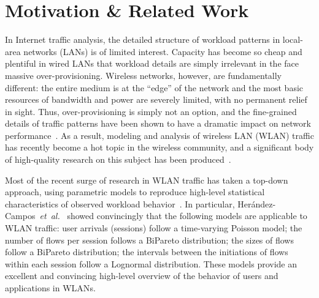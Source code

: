 \documentclass[conference]{IEEEtran}
\newcommand{\caps}[1]{{\small{#1}}}
\begin{document}


\section{Motivation \& Related Work}
\label{sec:motivation}
\label{sec:related-work}

In Internet traffic analysis, the detailed structure of workload patterns in local-area networks (\caps{LAN}s) is of limited interest. 
Capacity has become so cheap and plentiful in wired \caps{LAN}s that workload details are simply irrelevant in the face massive over-provisioning. Wireless networks, however, are fundamentally different: the entire medium is at the ``edge'' of the network and the most basic resources of bandwidth and power are severely limited, with no permanent relief in sight. Thus, over-provisioning is simply not an option, and the fine-grained details of traffic patterns have been shown to have a dramatic impact on network performance~\cite{Karpinski07:realism,Karpinski07:cbr-failure}.
As a result, modeling and analysis of wireless \caps{LAN} (\caps{WLAN}) traffic has recently become a hot topic in the wireless community, and a significant body of high-quality research on this subject has been produced~\cite{Papadopouli05,Hernandez06:wlan-traffic,Ploumidis07,Karaliopoulos07,Karpinski07:realism,Karpinski07:cbr-failure}.

Most of the recent surge of research in \caps{WLAN} traffic has taken a top-down approach, using parametric models to reproduce high-level statistical characteristics of observed workload behavior~\cite{Papadopouli05,Hernandez06:wlan-traffic,Ploumidis07,Karaliopoulos07}. In particular, Her\'andez-Campos~\textit{et~al.}~\cite{Hernandez06:wlan-traffic} showed convincingly that the following models are applicable to \caps{WLAN} traffic: user arrivals (sessions) follow a time-varying Poisson model; the number of flows per session follows a BiPareto distribution; the sizes of flows follow a BiPareto distribution; the intervals between the initiations of flows within each session follow a Lognormal distribution. These models provide an excellent and convincing high-level overview of the behavior of users and applications in \caps{WLAN}s.
\end{document}
